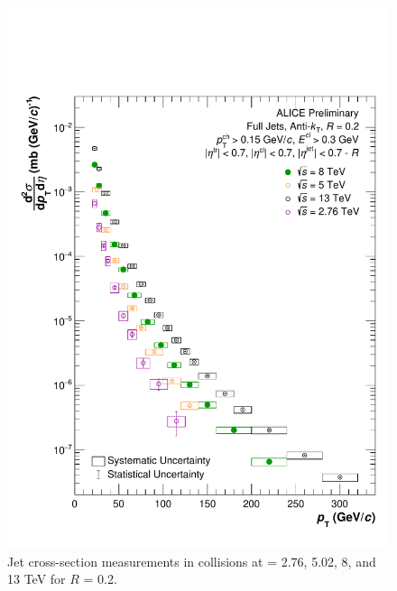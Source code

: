 \begin{figure}[h!]
    \centering
    \includegraphics[width=15cm]{figures/EnergyComparisons/SpectrumComparison_R02.pdf}
    \caption{Jet cross-section measurements in \pp collisions at \s = 2.76, 5.02, 8, and 13 TeV for $R$ = 0.2.}
    \label{fig:appSpecCompareR02}
\end{figure}

